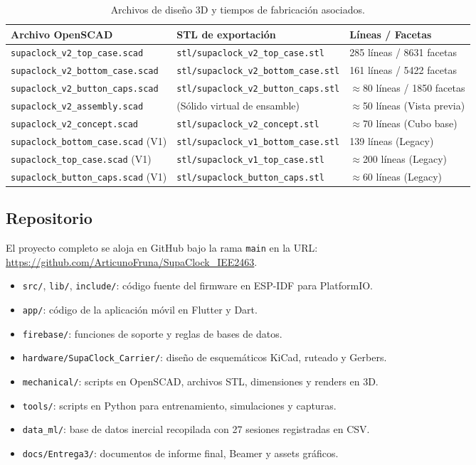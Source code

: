 \documentclass[letterpaper,11pt]{article}
\begin{document}
\begin{table}[H]
\centering
\caption{Archivos de diseño 3D y tiempos de fabricación asociados.}
\label{tab:openscad_files}
\small
\begin{tabular}{lll}
\toprule
\textbf{Archivo OpenSCAD} & \textbf{STL de exportación} & \textbf{Líneas / Facetas} \\
\midrule
\texttt{supaclock\_v2\_top\_case.scad} & \texttt{stl/supaclock\_v2\_top\_case.stl} & 285 líneas / 8631 facetas \\
\texttt{supaclock\_v2\_bottom\_case.scad} & \texttt{stl/supaclock\_v2\_bottom\_case.stl} & 161 líneas / 5422 facetas \\
\texttt{supaclock\_v2\_button\_caps.scad} & \texttt{stl/supaclock\_v2\_button\_caps.stl} & $\approx$80 líneas / 1850 facetas \\
\texttt{supaclock\_v2\_assembly.scad} & (Sólido virtual de ensamble) & $\approx$50 líneas (Vista previa) \\
\texttt{supaclock\_v2\_concept.scad} & \texttt{stl/supaclock\_v2\_concept.stl} & $\approx$70 líneas (Cubo base) \\
\texttt{supaclock\_bottom\_case.scad} (V1) & \texttt{stl/supaclock\_v1\_bottom\_case.stl} & 139 líneas (Legacy) \\
\texttt{supaclock\_top\_case.scad} (V1) & \texttt{stl/supaclock\_v1\_top\_case.stl} & $\approx$200 líneas (Legacy) \\
\texttt{supaclock\_button\_caps.scad} (V1) & \texttt{stl/supaclock\_button\_caps.stl} & $\approx$60 líneas (Legacy) \\
\bottomrule
\end{tabular}
\end{table}

\subsection{Repositorio}\label{sec:anexo_repo}

El proyecto completo se aloja en GitHub bajo la rama \texttt{main} en la URL:\\ \url{https://github.com/ArticunoFruna/SupaClock_IEE2463}.
\begin{itemize}
    \item \texttt{src/}, \texttt{lib/}, \texttt{include/}: código fuente del firmware en ESP-IDF para PlatformIO.
    \item \texttt{app/}: código de la aplicación móvil en Flutter y Dart.
    \item \texttt{firebase/}: funciones de soporte y reglas de bases de datos.
    \item \texttt{hardware/SupaClock\_Carrier/}: diseño de esquemáticos KiCad, ruteado y Gerbers.
    \item \texttt{mechanical/}: scripts en OpenSCAD, archivos STL, dimensiones y renders en 3D.
    \item \texttt{tools/}: scripts en Python para entrenamiento, simulaciones y capturas.
    \item \texttt{data\_ml/}: base de datos inercial recopilada con 27 sesiones registradas en CSV.
    \item \texttt{docs/Entrega3/}: documentos de informe final, Beamer y assets gráficos.
\end{itemize}
\end{document}
